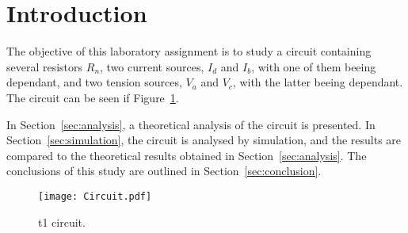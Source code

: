 \clearpage
\section{Introduction}
\label{sec:introduction}

The objective of this laboratory assignment is to study a circuit containing several resistors $R_n$, two current sources, $I_d$ and $I_b$, with one of them beeing dependant, and two tension sources, $V_a$ and $V_c$, with the latter beeing dependant. The circuit can be seen if Figure~\ref{fig:Circuit}.


In Section~\ref{sec:analysis}, a theoretical analysis of the circuit is
presented. In Section~\ref{sec:simulation}, the circuit is analysed by
simulation, and the results are compared to the theoretical results obtained in
Section~\ref{sec:analysis}. The conclusions of this study are outlined in
Section~\ref{sec:conclusion}.

\begin{figure}[h] \centering
\texttt{[image: Circuit.pdf]}
\caption{t1 circuit.}
\label{fig:Circuit}
\end{figure}
\clearpage
